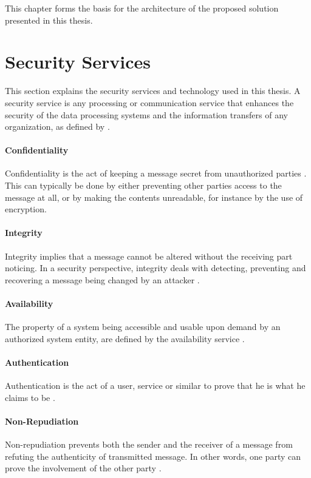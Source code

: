 \documentclass[pdftex,english,10pt,b5paper,twoside]{book}
\begin{document}
This chapter forms the basis for the architecture of the proposed solution
presented in this thesis.

\section{Security Services}

This section explains the security services and technology used in this thesis. A security
service is any processing or communication service that enhances the security of
the data processing systems and the information transfers of any organization,
as defined by \citet[p. 12]{stallings}.

\paragraph{Confidentiality} Confidentiality is the act of keeping a message
secret from unauthorized parties \cite[p. 18]{stallings}. This can typically be
done by either preventing other parties access to the message at all, or by making
the contents unreadable, for instance by the use of encryption.

\paragraph{Integrity} Integrity implies that a message cannot be altered
without the receiving part noticing. In a security perspective, integrity deals
with detecting, preventing and recovering a message being changed by an
attacker \cite{stallings}.

\paragraph{Availability} The property of a system being accessible and usable
upon demand by an authorized system entity, are defined by the availability
service \cite{stallings}.

\paragraph{Authentication} Authentication is the act of a user, service or
similar to prove that he is what he claims to be \cite{stallings}.

\paragraph{Non-Repudiation} Non-repudiation prevents both the sender and the
receiver of a message from refuting the authenticity of transmitted message. In
other words, one party can prove the involvement of the other party
\cite{stallings}.
\end{document}
